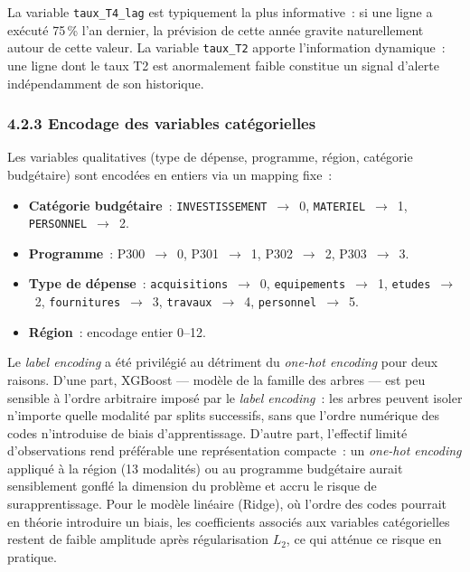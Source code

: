\noindent
La variable \texttt{taux\_T4\_lag} est typiquement la plus informative~: si une
ligne a ex\'ecut\'e 75\,\% l'an dernier, la pr\'evision de cette ann\'ee gravite
naturellement autour de cette valeur. La variable \texttt{taux\_T2} apporte
l'information dynamique~: une ligne dont le taux T2 est anormalement faible
constitue un signal d'alerte ind\'ependamment de son historique.

\subsubsection*{4.2.3 \quad Encodage des variables cat\'egorielles}

Les variables qualitatives (type de d\'epense, programme, r\'egion, cat\'egorie
budg\'etaire) sont encod\'ees en entiers via un mapping fixe~:

\begin{itemize}
    \item \textbf{Cat\'egorie budg\'etaire}~: \texttt{INVESTISSEMENT}~$\rightarrow$~0,
    \texttt{MATERIEL}~$\rightarrow$~1, \texttt{PERSONNEL}~$\rightarrow$~2.
    \item \textbf{Programme}~: P300~$\rightarrow$~0, P301~$\rightarrow$~1,
    P302~$\rightarrow$~2, P303~$\rightarrow$~3.
    \item \textbf{Type de d\'epense}~: \texttt{acquisitions}~$\rightarrow$~0,
    \texttt{equipements}~$\rightarrow$~1, \texttt{etudes}~$\rightarrow$~2,
    \texttt{fournitures}~$\rightarrow$~3, \texttt{travaux}~$\rightarrow$~4,
    \texttt{personnel}~$\rightarrow$~5.
    \item \textbf{R\'egion}~: encodage entier 0--12.
\end{itemize}

\noindent
Le \textit{label encoding} a \'et\'e privil\'egi\'e au d\'etriment du \textit{one-hot
encoding} pour deux raisons. D'une part, XGBoost --- mod\`ele de la famille des arbres ---
est peu sensible \`a l'ordre arbitraire impos\'e par le \textit{label encoding}~:
les arbres peuvent isoler n'importe quelle modalit\'e par splits successifs, sans que
l'ordre num\'erique des codes n'introduise de biais d'apprentissage. D'autre part,
l'effectif limit\'e d'observations rend pr\'ef\'erable une repr\'esentation compacte~:
un \textit{one-hot encoding} appliqu\'e \`a la r\'egion (13 modalit\'es) ou au programme
budg\'etaire aurait sensiblement gonfl\'e la dimension du probl\`eme et accru le risque
de surapprentissage. Pour le mod\`ele lin\'eaire (Ridge), o\`u l'ordre des codes pourrait
en th\'eorie introduire un biais, les coefficients associ\'es aux variables cat\'egorielles
restent de faible amplitude apr\`es r\'egularisation $L_2$, ce qui att\'enue ce risque
en pratique.

